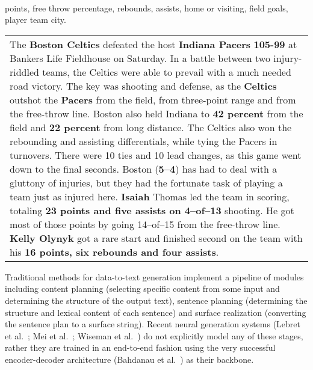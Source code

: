 \documentclass[letterpaper]{article} \usepackage{aaai19}  \usepackage{times}  \usepackage{helvet}  \usepackage{courier}  \usepackage{url}  \usepackage{graphicx}  \frenchspacing  \setlength{\pdfpagewidth}{8.5in}  \setlength{\pdfpageheight}{11in}  \graphicspath{ {images/} }
\newcommand{\lform}[1]{\textsf{\fontsize{7.5pt}{.1pt}\selectfont{#1}}}
\begin{document}
\begin{table*}
\begin{small}
\begin{minipage}[c]{0.37\linewidth}
\begin{tabular}{@{}l@{~~}c@{~~}c@{~}r@{~~}c@{~~}c@{~~}l@{~~}l@{}}
\end{tabular}\\
\lform{PTS:} points, \lform{FT\_PCT:} free throw percentage,
\lform{RB:}  rebounds, \lform{AST:} 
assists, \lform{H/V:} home or visiting, \lform{FG:} field goals,
\lform{CITY:} player team city.
\end{minipage}
\begin{minipage}[c]{0.1\linewidth}
  \begin{tabular}{p{10.7cm}} \hline The \textbf{Boston Celtics}
    defeated the host \textbf{Indiana Pacers} \textbf{105-99} at
    Bankers Life Fieldhouse on Saturday. In a battle between two
    injury-riddled teams, the Celtics were able to prevail with a much
    needed road victory. The key was shooting and defense, as the
    \textbf{Celtics} outshot the \textbf{Pacers} from the field, from
    three-point range and from the free-throw line. Boston also held
    Indiana to \textbf{42 percent} from the field and \textbf{22
      percent} from long distance. The Celtics also won the rebounding
    and assisting differentials, while tying the Pacers in
    turnovers. There were 10 ties and 10 lead changes, as this game
    went down to the final seconds. Boston (\textbf{5--4}) has had to deal with
    a gluttony of injuries, but they had the fortunate task of playing
    a team just as injured here. \textbf{Isaiah} Thomas led the team in
    scoring, totaling \textbf{23 points and five assists on 4--of--13}
    shooting. He got most of those points by going 14--of--15 from the
    free-throw line. \textbf{Kelly Olynyk} got a rare start and finished second
    on the team with his \textbf{16 points, six rebounds and four assists}.
\end{tabular}
\end{minipage}
\end{small}
\label{fig:example}
\caption{Example of data-records and document
  summary. Entities and values corresponding to the plan in
  Table~\ref{tbl:example-content-plan} are boldfaced.}
\end{table*}

Traditional methods for data-to-text generation \cite{P83-1022,mckeown1992text} implement a pipeline
of modules including content planning (selecting specific content from some input and determining the
structure of the output text), sentence planning (determining the structure and lexical content of each sentence)
 and surface realization (converting the sentence plan to a surface string).
Recent neural generation systems (Lebret et
al.~\citeyear{D16-1128}; Mei et al.~\citeyear{N16-1086}; Wiseman et
al.~\citeyear{wiseman2017challenges}) do not explicitly model any of
these stages, rather they are trained in an end-to-end fashion using
the very successful encoder-decoder architecture (Bahdanau et
al.~\citeyear{bahdanau2015neural}) as their backbone.
\end{document}
